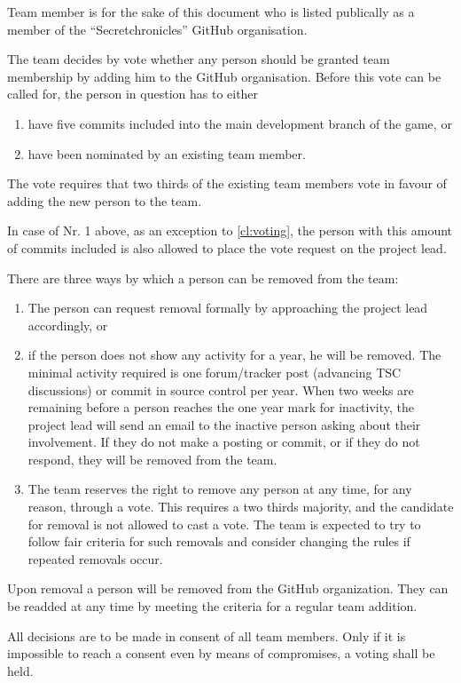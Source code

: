 \documentclass[10pt,a4paper,DIV=calc,headings=medium,twocolumn,final]{scrartcl}
\begin{document}
\begin{contract}

  Team member is for the sake of this document who is listed
  publically as a member of the “Secretchronicles” GitHub
  organisation.


  The team decides by vote whether any person should be granted team
  membership by adding him to the GitHub organisation. Before this
  vote can be called for, the person in question has to either

  \begin{enumerate}
  \item have five commits included into the main development branch of the
    game, or
  \item have been nominated by an existing team member.
  \end{enumerate}

  The vote requires that two thirds of the existing team members vote
  in favour of adding the new person to the team.

  In case of Nr. 1 above, as an exception to \ref{cl:voting}, the
  person with this amount of commits included is also allowed to place
  the vote request on the project lead.


  There are three ways by which a person can be removed from the team:

  \begin{enumerate}
  \item The person can request removal formally by approaching the
    project lead accordingly, or
  \item if the person does not show any activity for a year, he will
    be removed.  The minimal activity required is one forum/tracker
    post (advancing TSC discussions) or commit in source control per
    year. When two weeks are remaining before a person reaches the one
    year mark for inactivity, the project lead will send an email to
    the inactive person asking about their involvement.  If they do
    not make a posting or commit, or if they do not respond, they will
    be removed from the team.
  \item The team reserves the right to remove any person at any time,
    for any reason, through a vote.  This requires a two thirds
    majority, and the candidate for removal is not allowed to cast a
    vote.  The team is expected to try to follow fair criteria for
    such removals and consider changing the rules if repeated removals
    occur.
  \end{enumerate}

  Upon removal a person will be removed from the GitHub organization.
  They can be readded at any time by meeting the criteria for a
  regular team addition.


  All decisions are to be made in consent of all team members. Only if
  it is impossible to reach a consent even by means of compromises, a
  voting shall be held.
\end{contract}
\end{document}
